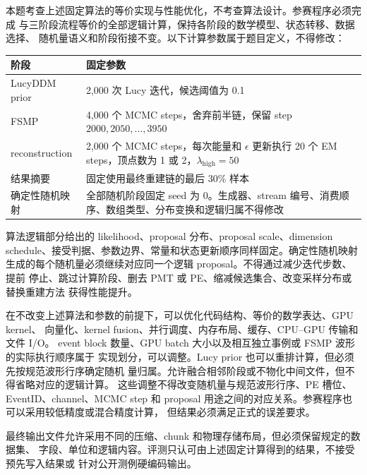 \documentclass[UTF8,a4paper,11pt]{ctexart}
\begin{document}
本题考查上述固定算法的等价实现与性能优化，不考查算法设计。参赛程序必须完成
与三阶段流程等价的全部逻辑计算，保持各阶段的数学模型、状态转移、数据选择、
随机量语义和阶段衔接不变。以下计算参数属于题目定义，不得修改：

\begin{longtable}[]{@{}L{0.31\textwidth}L{0.62\textwidth}@{}}
\toprule\noalign{}
阶段 & 固定参数 \\
\midrule\noalign{}
\endhead
\bottomrule\noalign{}
\endlastfoot
LucyDDM prior & 2,000 次 Lucy 迭代，候选阈值为 0.1 \\
FSMP & 4,000 个 MCMC steps，舍弃前半链，保留 step \(2000,2050,\ldots,3950\) \\
reconstruction & 2,000 个 MCMC steps，每次能量和 \(\epsilon\) 更新执行 20 个 EM steps，顶点数为 1 或 2，\(\lambda_{\mathrm{high}}=50\) \\
结果摘要 & 固定使用最终重建链的最后 30\% 样本 \\
确定性随机映射 & 全部随机阶段固定 seed 为 0。生成器、stream 编号、消费顺序、数组类型、分布变换和逻辑归属不得修改 \\
\end{longtable}

算法逻辑部分给出的 likelihood、proposal 分布、proposal scale、dimension
schedule、接受判据、参数边界、常量和状态更新顺序同样固定。确定性随机映射
生成的每个随机量必须继续对应同一个逻辑 proposal。不得通过减少迭代步数、提前
停止、跳过计算阶段、删去 PMT 或 PE、缩减候选集合、改变采样分布或替换重建方法
获得性能提升。

在不改变上述算法和参数的前提下，可以优化代码结构、等价的数学表达、GPU kernel、
向量化、kernel fusion、并行调度、内存布局、缓存、CPU--GPU 传输和文件 I/O。
event block 数量、GPU batch 大小以及相互独立事例或 FSMP 波形的实际执行顺序属于
实现划分，可以调整。Lucy prior 也可以重排计算，但必须先按规范波形行序确定随机
量归属。允许融合相邻阶段或不物化中间文件，但不得省略对应的逻辑计算。
这些调整不得改变随机量与规范波形行序、PE 槽位、EventID、channel、MCMC step
和 proposal 用途之间的对应关系。参赛程序也可以采用较低精度或混合精度计算，
但结果必须满足正式的误差要求。

最终输出文件允许采用不同的压缩、chunk 和物理存储布局，但必须保留规定的数据集、
字段、单位和逻辑内容。评测只认可由上述固定计算得到的结果，不接受预先写入结果或
针对公开测例硬编码输出。
\end{document}
